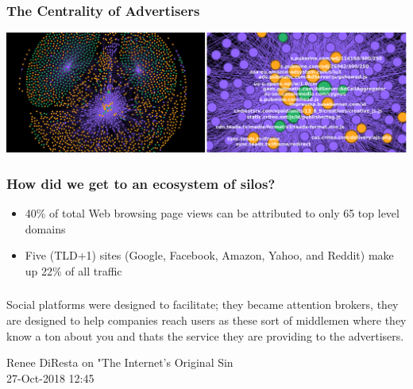 \documentclass[aspectratio=169]{beamer}
\renewcommand{\large}{\fontsize{16pt}{24pt}\selectfont}
\begin{document}
\begin{frame}
\frametitle{The Centrality of Advertisers}
\large{Are trackers the new backbone of the Web?}
\begin{center}
\includegraphics[width=0.85\paperwidth]{0thN-8lZ4H2_xjbkt.png}
\end{center}


\end{frame}

\begin{frame}
\frametitle{How did we get to an ecosystem of silos?}
\begin{itemize}
\item{40\% of total Web browsing page views can be attributed to only 65 top level domains}
\item{Five (TLD+1) sites (Google, Facebook, Amazon, Yahoo, and Reddit) make up 22\% of all traffic}
\end{itemize}


\end{frame}

\begin{frame}
\frametitle{}
\epigraph{Social platforms were designed to facilitate; they became attention brokers, they are designed to help companies reach users as these sort of middlemen where they know a ton about you and thats the service they are providing to the advertisers.}{Renee DiResta on "The Internet's Original Sin\\ 27-Oct-2018 12:45}
\end{frame}
\end{document}
